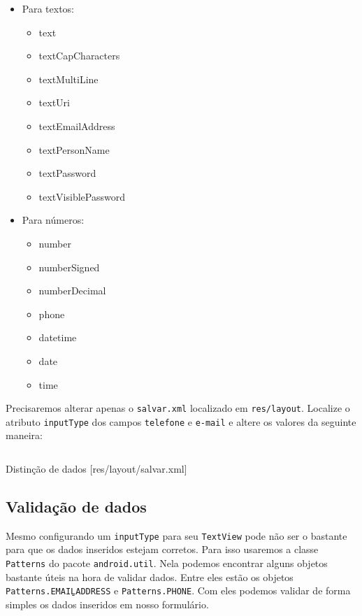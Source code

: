 \begin{itemize}

  \item Para textos:
  \begin{itemize}
    \item text
    \item textCapCharacters
    \item textMultiLine
    \item textUri
    \item textEmailAddress
    \item textPersonName
    \item textPassword
    \item textVisiblePassword
  \end{itemize}

  \item Para números:
  \begin{itemize}
    \item number
    \item numberSigned
    \item numberDecimal
    \item phone
    \item datetime
    \item date
    \item time
  \end{itemize}

\end{itemize}

Precisaremos alterar apenas o \texttt{salvar.xml} localizado em \texttt{res/layout}. Localize o atributo
\texttt{inputType} dos campos \texttt{telefone} e \texttt{e-mail} e altere os valores da seguinte maneira:

\begin{listing}[H]
  \inputminted[linenos=true,frame=bottomline,tabsize=3]{ xml }{ source/salvar-2.xml }
  \caption{Distinção de dados [res/layout/salvar.xml]}
\end{listing}

\subsection{Validação de dados}

Mesmo configurando um \texttt{inputType} para seu \texttt{TextView} pode não ser o bastante para que
os dados inseridos estejam corretos. Para isso usaremos a classe \texttt{Patterns} do pacote
\texttt{android.util}. Nela podemos encontrar alguns objetos bastante úteis na hora de validar
dados. Entre eles estão os objetos \texttt{Patterns.EMAIL\b{ }ADDRESS} e \texttt{Patterns.PHONE}. Com
eles podemos validar de forma simples os dados inseridos em nosso formulário.

